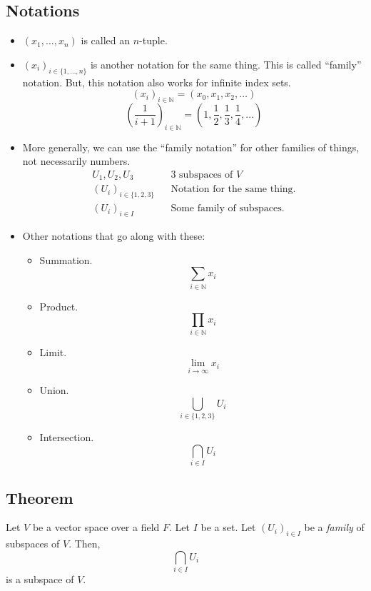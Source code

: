\documentclass[11pt]{article}
\begin{document}
    \subsection{Notations}

    \begin{itemize}
        \item \((x_1, \dots, x_n)\) is called an $n$-tuple.
        \item \((x_i)_{i \in \{1, \dots, n\}}\) is another notation for the same thing. This is called ``family'' notation. But, this notation also works for infinite index sets. \[ (x_i)_{i \in \mathbb{N}} = (x_0, x_1, x_2, \dots) \] \[ \left( \frac{1}{i + 1} \right)_{i \in \mathbb{N}} = \left( 1, \frac{1}{2}, \frac{1}{3}, \frac{1}{4}, \dots \right) \]
        \item More generally, we can use the ``family notation'' for other families of things, not necessarily numbers. 
        \begin{align*}
            U_1, U_2, U_3 && \text{3 subspaces of $V$} \\
            (U_i)_{i \in \{ 1,2,3 \}} && \text{Notation for the same thing.} \\
            (U_i)_{i \in I} && \text{Some family of subspaces.}
        \end{align*}

        \pagebreak
        
        \item Other notations that go along with these:
        \begin{itemize}
            \item Summation. \[\sum_{i \in \mathbb{N}} x_i\]
            \item Product. \[\prod_{i \in \mathbb{N}} x_i \]
            \item Limit. \[\lim_{i \to \infty} x_i\]
            \item Union. \[ \bigcup_{i \in \{1,2,3\}} U_i \]
            \item Intersection. \[ \bigcap_{i \in I} U_i\] 
        \end{itemize}
    \end{itemize}

    \subsection{Theorem}

    Let $V$ be a vector space over a field $F$. Let $I$ be a set. Let \((U_i)_{i \in I}\) be a \emph{family} of subspaces of $V$. Then, \[\bigcap_{i \in I} U_i\] is a subspace of $V$.
\end{document}
